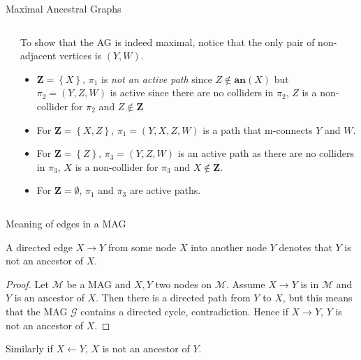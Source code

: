 \documentclass[english, compress, red]{beamer}
\begin{document}
\begin{frame}{Maximal Ancestral Graphs}
	\begin{columns}
		\begin{column}{0.3\textwidth}
			\centering
		\end{column}
	     \begin{column}{0.7\textwidth}
	     	To show that the AG is indeed maximal, notice that the only pair of non-adjacent vertices is $(Y,W)$.
	     	\begin{itemize}
	     		\item $\mathbf{Z} = \left\{ X\right\}$, $\pi_1$ is \textit{not an active path} since $Z \not \in \textbf{an}(X)$ but $\pi_2 = (Y,Z,W)$ is active since there are no colliders in $\pi_2$, $Z$ is a non-collider for $\pi_2$ and $Z \not \in \mathbf{Z}$
	     		\item For $\mathbf{Z} = \left\{ X, Z\right\}$, $\pi_1 = (Y,X,Z,W)$ is a path that m-connects $Y$ and $W$.
	     		\item For $\mathbf{Z} = \left\{ Z\right\}$, $\pi_3 = (Y,Z,W)$ is an active path as there are no colliders in $\pi_3$, $X$ is a non-collider for $\pi_3$ and $X \not \in \mathbf{Z}$.
	     		\item For $\mathbf{Z} = \emptyset$, $\pi_1$ and $\pi_3$ are active paths.
	     	\end{itemize}
	     \end{column}
	\end{columns}
\end{frame}

\begin{frame}{Meaning of edges in a MAG}
	\begin{theorem}
		A directed edge $X \rightarrow Y$ from some node $X$ into another node $Y$ denotes that $Y$ is not an ancestor of $X$.
	\end{theorem}
	\begin{proof}
		Let $\mathcal{M}$ be a MAG and $X,Y$ two nodes on $\mathcal{M}$. Assume $X \rightarrow Y$ is in $\mathcal{M}$ and $Y$ is an ancestor of $X$. Then there is a directed path from $Y$ to $X$, but this means that the MAG $\mathcal{G}$ contains a directed cycle, contradiction. Hence if $X \rightarrow Y$, $Y$ is not an ancestor of $X$.
	\end{proof}
	Similarly if $X \leftarrow Y$, $X$ is not an ancestor of $Y$.
	
\end{frame}
\end{document}
